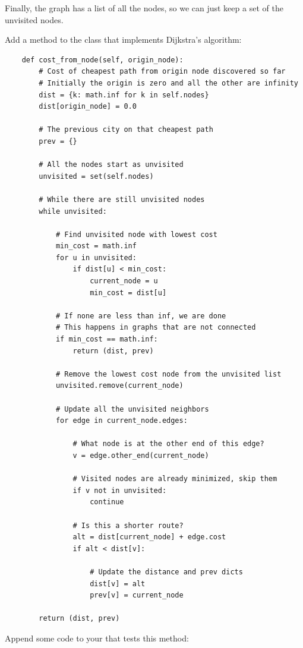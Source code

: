 Finally, the graph has a list of all the nodes, so we can just keep a
set of the unvisited nodes.

Add a method to the  class that implements Dijkstra's algorithm:
\begin{verbatim}
    def cost_from_node(self, origin_node):
        # Cost of cheapest path from origin node discovered so far
        # Initially the origin is zero and all the other are infinity
        dist = {k: math.inf for k in self.nodes}
        dist[origin_node] = 0.0

        # The previous city on that cheapest path
        prev = {}

        # All the nodes start as unvisited
        unvisited = set(self.nodes)
    
        # While there are still unvisited nodes
        while unvisited:

            # Find unvisited node with lowest cost
            min_cost = math.inf
            for u in unvisited:
                if dist[u] < min_cost:
                    current_node = u
                    min_cost = dist[u]

            # If none are less than inf, we are done
            # This happens in graphs that are not connected
            if min_cost == math.inf:
                return (dist, prev)
            
            # Remove the lowest cost node from the unvisited list
            unvisited.remove(current_node)

            # Update all the unvisited neighbors
            for edge in current_node.edges:

                # What node is at the other end of this edge?
                v = edge.other_end(current_node)

                # Visited nodes are already minimized, skip them
                if v not in unvisited:
                    continue

                # Is this a shorter route?
                alt = dist[current_node] + edge.cost
                if alt < dist[v]:

                    # Update the distance and prev dicts
                    dist[v] = alt
                    prev[v] = current_node

        return (dist, prev)
\end{verbatim}

Append some code to your  that tests this method:

